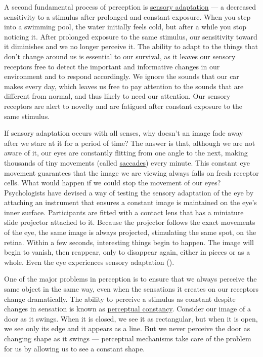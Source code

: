 \documentclass[
]{krantz}
\begin{document}
A second fundamental process of perception is \hyperref[sensory-adaptation]{sensory adaptation} --- a decreased sensitivity to a stimulus after prolonged and constant exposure. When you step into a swimming pool, the water initially feels cold, but after a while you stop noticing it. After prolonged exposure to the same stimulus, our sensitivity toward it diminishes and we no longer perceive it. The ability to adapt to the things that don't change around us is essential to our survival, as it leaves our sensory receptors free to detect the important and informative changes in our environment and to respond accordingly. We ignore the sounds that our car makes every day, which leaves us free to pay attention to the sounds that are different from normal, and thus likely to need our attention. Our sensory receptors are alert to novelty and are fatigued after constant exposure to the same stimulus.

If sensory adaptation occurs with all senses, why doesn't an image fade away after we stare at it for a period of time? The answer is that, although we are not aware of it, our eyes are constantly flitting from one angle to the next, making thousands of tiny movements (called \hyperref[saccades]{saccades}) every minute. This constant eye movement guarantees that the image we are viewing always falls on fresh receptor cells. What would happen if we could stop the movement of our eyes? Psychologists have devised a way of testing the sensory adaptation of the eye by attaching an instrument that ensures a constant image is maintained on the eye's inner surface. Participants are fitted with a contact lens that has a miniature slide projector attached to it. Because the projector follows the exact movements of the eye, the same image is always projected, stimulating the same spot, on the retina. Within a few seconds, interesting things begin to happen. The image will begin to vanish, then reappear, only to disappear again, either in pieces or as a whole. Even the eye experiences sensory adaptation ().

One of the major problems in perception is to ensure that we always perceive the same object in the same way, even when the sensations it creates on our receptors change dramatically. The ability to perceive a stimulus as constant despite changes in sensation is known as \hyperref[perceptual-constancy]{perceptual constancy}. Consider our image of a door as it swings. When it is closed, we see it as rectangular, but when it is open, we see only its edge and it appears as a line. But we never perceive the door as changing shape as it swings --- perceptual mechanisms take care of the problem for us by allowing us to see a constant shape.
\end{document}
